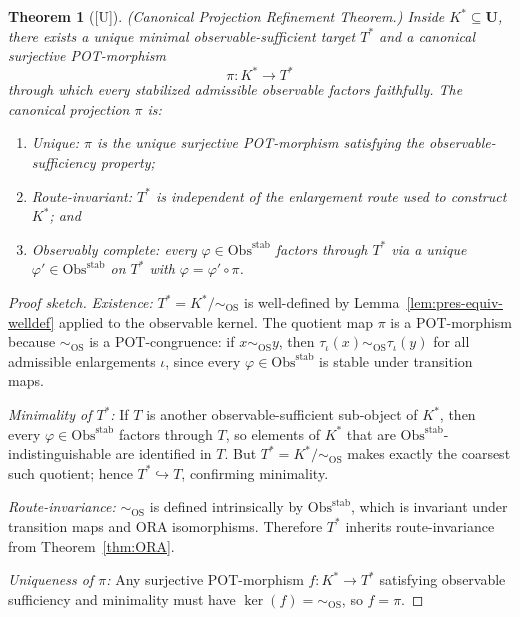 \documentclass[12pt,oneside]{amsbook}
\theoremstyle{plain}
\newtheorem{theorem}{Theorem}[section]
\theoremstyle{definition}
\theoremstyle{remark}
\newcommand{\status}[1]{\textup{[#1]}}
\begin{document}
\begin{theorem}[\status{U}]\label{thm:canonical-projection}
\textup{(Canonical Projection Refinement Theorem.)}  Inside
$K^* \subseteq \mathbf{U}$, there exists a unique minimal
observable-sufficient target $T^*$ and a canonical surjective
POT-morphism
\[
  \pi: K^* \to T^*
\]
through which every stabilized admissible observable factors faithfully.
The canonical projection $\pi$ is:
\begin{enumerate}[label=\textup{(\alph*)}]
  \item \textup{Unique:} $\pi$ is the unique surjective POT-morphism
        satisfying the observable-sufficiency property;
  \item \textup{Route-invariant:} $T^*$ is independent of the
        enlargement route used to construct $K^*$; and
  \item \textup{Observably complete:} every
        $\varphi \in \mathrm{Obs}^{\mathrm{stab}}$ factors through
        $T^*$ via a unique $\varphi' \in \mathrm{Obs}^{\mathrm{stab}}$
        on $T^*$ with $\varphi = \varphi' \circ \pi$.
\end{enumerate}
\end{theorem}

\begin{proof}[Proof sketch]
\emph{Existence:} $T^* = K^*/{\sim_{\mathrm{OS}}}$ is well-defined by
Lemma~\ref{lem:pres-equiv-welldef} applied to the observable kernel.
The quotient map $\pi$ is a POT-morphism because $\sim_{\mathrm{OS}}$
is a POT-congruence: if $x \sim_{\mathrm{OS}} y$, then $\tau_\iota(x)
\sim_{\mathrm{OS}} \tau_\iota(y)$ for all admissible enlargements
$\iota$, since every $\varphi \in \mathrm{Obs}^{\mathrm{stab}}$ is
stable under transition maps.

\emph{Minimality of $T^*$:} If $T$ is another observable-sufficient
sub-object of $K^*$, then every $\varphi \in \mathrm{Obs}^{\mathrm{stab}}$
factors through $T$, so elements of $K^*$ that are
$\mathrm{Obs}^{\mathrm{stab}}$-indistinguishable are identified in $T$.
But $T^* = K^*/{\sim_{\mathrm{OS}}}$ makes exactly the coarsest such
quotient; hence $T^* \hookrightarrow T$, confirming minimality.

\emph{Route-invariance:} $\sim_{\mathrm{OS}}$ is defined intrinsically
by $\mathrm{Obs}^{\mathrm{stab}}$, which is invariant under transition
maps and ORA isomorphisms.  Therefore $T^*$ inherits route-invariance
from Theorem~\ref{thm:ORA}.

\emph{Uniqueness of $\pi$:} Any surjective POT-morphism $f: K^* \to
T^*$ satisfying observable sufficiency and minimality must have
$\ker(f) = {\sim_{\mathrm{OS}}}$, so $f = \pi$.
\end{proof}
\end{document}
